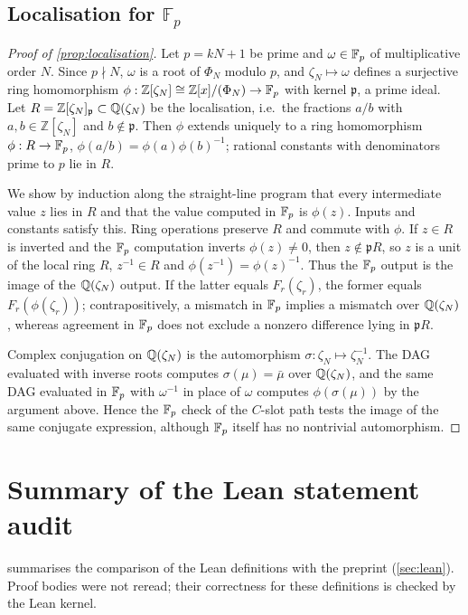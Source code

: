 \documentclass[11pt]{article}
\theoremstyle{plain}
\newcommand{\Z}{\mathbb{Z}}
\begin{document}
\subsection{Localisation for \texorpdfstring{$\mathbb{F}_p$}{Fp}}\label{app:localisation}
\begin{proof}[Proof of \cref{prop:localisation}]
Let $p=kN+1$ be prime and $\omega\in\mathbb{F}_p$ of multiplicative order $N$. Since $p\nmid N$, $\omega$ is a root of $\Phi_N$ modulo $p$, and $\zeta_N\mapsto\omega$ defines a surjective ring homomorphism $\phi:\Z[\zeta_N]\cong\Z[x]/(\Phi_N)\to\Fp$ with kernel $\mathfrak p$, a prime ideal. Let $R=\Z[\zeta_N]_{\mathfrak p}\subset\Q(\zeta_N)$ be the localisation, i.e.\ the fractions $a/b$ with $a,b\in\Z[\zeta_N]$ and $b\notin\mathfrak p$. Then $\phi$ extends uniquely to a ring homomorphism $\phi:R\to\mathbb{F}_p$, $\phi(a/b)=\phi(a)\phi(b)^{-1}$; rational constants with denominators prime to $p$ lie in $R$.

We show by induction along the straight-line program that every intermediate value $z$ lies in $R$ and that the value computed in $\mathbb{F}_p$ is $\phi(z)$. Inputs and constants satisfy this. Ring operations preserve $R$ and commute with $\phi$. If $z\in R$ is inverted and the $\mathbb{F}_p$ computation inverts $\phi(z)\ne0$, then $z\notin\mathfrak pR$, so $z$ is a unit of the local ring $R$, $z^{-1}\in R$ and $\phi(z^{-1})=\phi(z)^{-1}$. Thus the $\mathbb{F}_p$ output is the image of the $\mathbb{Q}(\zeta_N)$ output. If the latter equals $F_r(\zeta_r)$, the former equals $F_r(\phi(\zeta_r))$; contrapositively, a mismatch in $\mathbb{F}_p$ implies a mismatch over $\mathbb{Q}(\zeta_N)$, whereas agreement in $\mathbb{F}_p$ does not exclude a nonzero difference lying in $\mathfrak pR$.

Complex conjugation on $\mathbb{Q}(\zeta_N)$ is the automorphism $\sigma:\zeta_N\mapsto\zeta_N^{-1}$. The DAG evaluated with inverse roots computes $\sigma(\mu)=\bar\mu$ over $\mathbb{Q}(\zeta_N)$, and the same DAG evaluated in $\mathbb{F}_p$ with $\omega^{-1}$ in place of $\omega$ computes $\phi(\sigma(\mu))$ by the argument above. Hence the $\mathbb{F}_p$ check of the $C$-slot path tests the image of the same conjugate expression, although $\mathbb{F}_p$ itself has no nontrivial automorphism.
\end{proof}

\section{Summary of the Lean statement audit}\label{app:lean}
 summarises the comparison of the Lean definitions with the preprint (\cref{sec:lean}). Proof bodies were not reread; their correctness for these definitions is checked by the Lean kernel.
\end{document}
